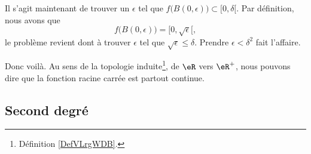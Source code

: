 Il s'agit maintenant de trouver un $\epsilon$ tel que $f\big( B(0,\epsilon) \big)\subset [0,\delta[$. Par définition, nous avons que
\[
  f\big( B(0,\epsilon) \big)=[0,\sqrt{\epsilon}[,
\]
le problème revient dont à trouver $\epsilon$ tel que $\sqrt{\epsilon}\leq\delta$. Prendre $\epsilon<\delta^2$ fait l'affaire.

Donc voilà. Au sens de la topologie induite\footnote{Définition \ref{DefVLrgWDB}.}, de \( \eR\) vers $\eR^+$, nous pouvons dire que la fonction racine carrée est partout continue.

\subsection{Second degré}


